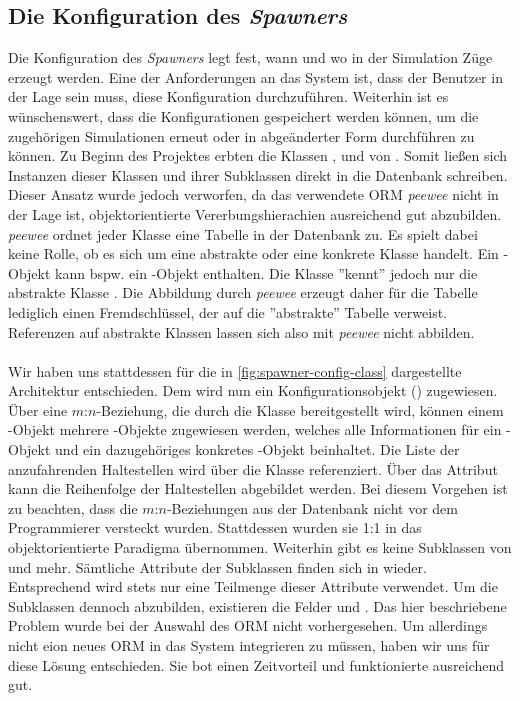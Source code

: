 \subsection{Die Konfiguration des \emph{Spawners}}

Die Konfiguration des \emph{Spawners} legt fest, wann und wo in der Simulation Züge erzeugt werden. Eine der Anforderungen an das System ist, dass der Benutzer in der Lage sein muss, diese Konfiguration durchzuführen. Weiterhin ist es wünschenswert, dass die Konfigurationen gespeichert werden können, um die zugehörigen Simulationen erneut oder in abgeänderter Form durchführen zu können. Zu Beginn des Projektes erbten die Klassen ,  und  von . Somit ließen sich Instanzen dieser Klassen und ihrer Subklassen direkt in die Datenbank schreiben. Dieser Ansatz wurde jedoch verworfen, da das verwendete ORM \emph{peewee} nicht in der Lage ist, objektorientierte Vererbungshierachien ausreichend gut abzubilden. \emph{peewee} ordnet jeder Klasse eine Tabelle in der Datenbank zu. Es spielt dabei keine Rolle, ob es sich um eine abstrakte oder eine konkrete Klasse handelt. Ein -Objekt kann bspw. ein -Objekt enthalten. Die Klasse  ''kennt'' jedoch nur die abstrakte Klasse . Die Abbildung durch \emph{peewee} erzeugt daher für die Tabelle  lediglich einen Fremdschlüssel, der auf die ''abstrakte'' Tabelle  verweist. Referenzen auf abstrakte Klassen lassen sich also mit \emph{peewee} nicht abbilden.\\
\\
Wir haben uns stattdessen für die in \autoref{fig:spawner-config-class} dargestellte Architektur entschieden. Dem  wird nun ein Konfigurationsobjekt () zugewiesen. Über eine $m$:$n$-Beziehung, die durch die Klasse  bereitgestellt wird, können einem -Objekt mehrere -Objekte zugewiesen werden, welches alle Informationen für ein -Objekt und ein dazugehöriges konkretes -Objekt beinhaltet. Die Liste der anzufahrenden Haltestellen wird über die Klasse  referenziert. Über das Attribut  kann die Reihenfolge der Haltestellen abgebildet werden. Bei diesem Vorgehen ist zu beachten, dass die $m$:$n$-Beziehungen aus der Datenbank nicht vor dem Programmierer versteckt wurden. Stattdessen wurden sie 1:1 in das objektorientierte Paradigma übernommen. Weiterhin gibt es keine Subklassen von  und  mehr. Sämtliche Attribute der Subklassen finden sich in  wieder. Entsprechend wird stets nur eine Teilmenge dieser Attribute verwendet. Um die Subklassen dennoch abzubilden, existieren die Felder  und . Das hier beschriebene Problem wurde bei der Auswahl des ORM nicht vorhergesehen. Um allerdings nicht eion neues ORM in das System integrieren zu müssen, haben wir uns für diese Lösung entschieden. Sie bot einen Zeitvorteil und funktionierte ausreichend gut.

